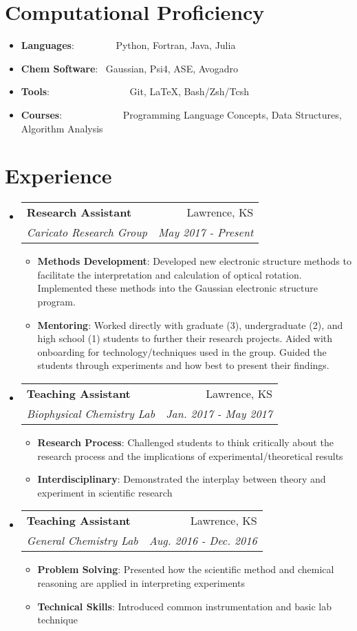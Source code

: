 \documentclass[a4paper,20pt]{article}
\makeatletter
\newcommand{\resumeItem}[2]{
  \item\small{
    \textbf{#1}{: #2 \vspace{-2pt}}
  }
}
\newcommand{\resumeSubheading}[4]{
  \vspace{-1pt}
    \item
    \begin{tabular*}{0.97\textwidth}{l@{\extracolsep{\fill}}r}
      \textbf{#1} & #2 \\
      \textit{#3} & \textit{#4} \\
    \end{tabular*}\vspace{-5pt}
}
\newcommand{\resumeSubItem}[2]{\resumeItem{#1}{#2}\vspace{-3pt}}
\newcommand{\resumeSubHeadingListStart}{\begin{itemize}[leftmargin=*]}
\newcommand{\resumeSubHeadingListEnd}{\end{itemize}}
\newcommand{\resumeItemListStart}{\begin{itemize}}
\newcommand{\resumeItemListEnd}{\end{itemize}\vspace{-5pt}}
\makeatother
\begin{document}
\vspace{-5pt}
\section{Computational Proficiency}
	\resumeSubHeadingListStart
	\resumeSubItem{Languages}{~~~~~~~~Python, Fortran, Java, Julia}
	\resumeSubItem{Chem Software}{~Gaussian, Psi4, ASE, Avogadro}
	\resumeSubItem{Tools}{~~~~~~~~~~~~~~~~Git, LaTeX, Bash/Zsh/Tcsh}
	\resumeSubItem{Courses}{~~~~~~~~~~~~Programming Language Concepts, Data Structures, Algorithm Analysis}
    \resumeSubHeadingListEnd
    
\vspace{-5pt}
\section{Experience}
  \resumeSubHeadingListStart
    \resumeSubheading{Research Assistant}{Lawrence, KS}
    {Caricato Research Group}{May 2017 - Present}
    \resumeItemListStart
        \resumeItem{Methods Development}
          {Developed new electronic structure methods to facilitate the interpretation and calculation of optical rotation. Implemented these methods into the Gaussian electronic structure program.}
          \resumeItem{Mentoring}
          {Worked directly with graduate (3), undergraduate (2), and high school (1) students to further their research projects. Aided with onboarding for technology/techniques used in the group. Guided the students through experiments and how best to present their findings.}
      \resumeItemListEnd
    \resumeSubheading
		{Teaching Assistant}{Lawrence, KS}
		{Biophysical Chemistry Lab}{Jan. 2017 - May 2017}
		\resumeItemListStart
        \resumeItem{Research Process}
          {Challenged students to think critically about the research process and the implications of experimental/theoretical results}
        \resumeItem{Interdisciplinary}
          {Demonstrated the interplay between theory and experiment in scientific research}
		\resumeItemListEnd

    \resumeSubheading
		{Teaching Assistant}{Lawrence, KS}
		{General Chemistry Lab}{Aug. 2016 - Dec. 2016}
		\resumeItemListStart
        \resumeItem{Problem Solving}
          {Presented how the scientific method and chemical reasoning are applied in interpreting experiments}
        \resumeItem{Technical Skills}
          {Introduced common instrumentation and basic lab technique}
		\resumeItemListEnd
\resumeSubHeadingListEnd


\vspace{-5pt}
\end{document}
